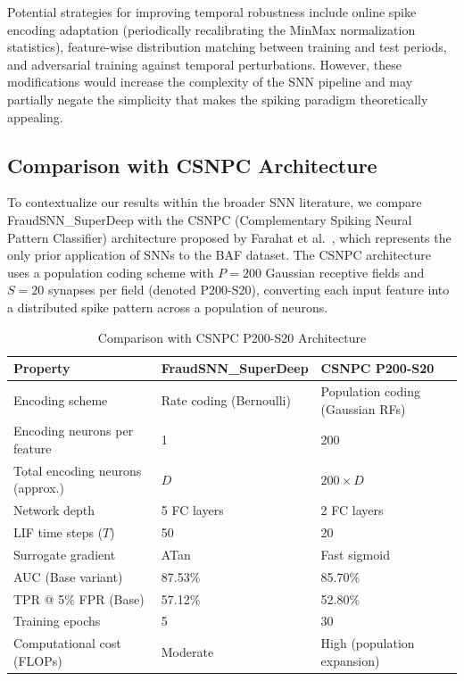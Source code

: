Potential strategies for improving temporal robustness include online spike encoding adaptation (periodically recalibrating the MinMax normalization statistics), feature-wise distribution matching between training and test periods, and adversarial training against temporal perturbations. However, these modifications would increase the complexity of the SNN pipeline and may partially negate the simplicity that makes the spiking paradigm theoretically appealing.

\subsection{Comparison with CSNPC Architecture}
\label{sec:snn-csnpc-comparison}

To contextualize our results within the broader SNN literature, we compare FraudSNN\_SuperDeep with the CSNPC (Complementary Spiking Neural Pattern Classifier) architecture proposed by Farahat et al.~\cite{farahat2025objective}, which represents the only prior application of SNNs to the BAF dataset. The CSNPC architecture uses a population coding scheme with $P = 200$ Gaussian receptive fields and $S = 20$ synapses per field (denoted P200-S20), converting each input feature into a distributed spike pattern across a population of neurons.

\begin{table}[H]
\centering
\caption{Comparison with CSNPC P200-S20 Architecture}
\label{tab:snn-csnpc-comparison}
\small
\begin{tabularx}{0.95\textwidth}{lXX}
\toprule
\textbf{Property} & \textbf{FraudSNN\_SuperDeep} & \textbf{CSNPC P200-S20} \\
\midrule
Encoding scheme & Rate coding (Bernoulli) & Population coding (Gaussian RFs) \\
Encoding neurons per feature & 1 & 200 \\
Total encoding neurons (approx.) & $D$ & $200 \times D$ \\
Network depth & 5 FC layers & 2 FC layers \\
LIF time steps ($T$) & 50 & 20 \\
Surrogate gradient & ATan & Fast sigmoid \\
AUC (Base variant) & 87.53\% & 85.70\% \\
TPR @ 5\% FPR (Base) & 57.12\% & 52.80\% \\
Training epochs & 5 & 30 \\
Computational cost (FLOPs) & Moderate & High (population expansion) \\
\bottomrule
\end{tabularx}
\end{table}

